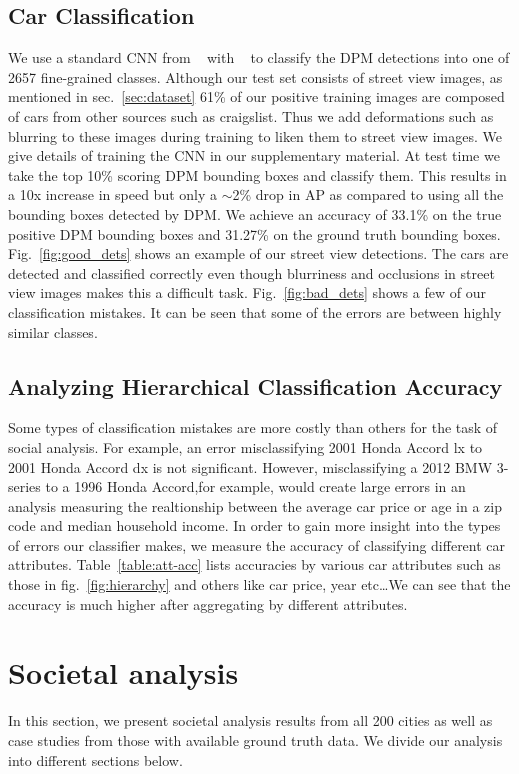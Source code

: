 \documentclass[10pt,twocolumn,letterpaper]{article}
\begin{document}
\subsection{Car Classification}
We use a standard CNN from ~\cite{alexnet} with ~\cite{caffe} to classify the DPM detections into one of 2657 fine-grained classes. Although our test set consists of street view images, as mentioned in sec.~\ref{sec:dataset} 61\% of our positive training images are composed of cars from other sources such as craigslist. Thus we add deformations such as blurring to these images during training to liken them to street view images. We give details of training the CNN in our supplementary material. At test time we take the top 10\% scoring DPM bounding boxes and classify them. This results in a 10x increase in speed but only a \(\sim\)2\% drop in AP as compared to using all the bounding boxes detected by DPM. We achieve an accuracy of 33.1\% on the true positive DPM bounding boxes and 31.27\% on the ground truth bounding boxes. Fig.~\ref{fig:good_dets} shows an example of our street view detections. The cars are detected and classified correctly even though blurriness and occlusions in street view images makes this a difficult task. Fig.~\ref{fig:bad_dets} shows a few of our classification mistakes. It can be seen that some of the errors are between highly similar classes.   

\subsection{Analyzing Hierarchical Classification Accuracy}
Some types of classification mistakes are more costly than others for the task of social analysis. For example, an error misclassifying 2001 Honda Accord lx to 2001 Honda Accord dx is not significant. However, misclassifying a 2012 BMW 3-series to a 1996 Honda Accord,for example, would create large errors in an analysis measuring the realtionship between the average car price or age in a zip code and median household income. In order to gain more insight into the types of errors our classifier makes, we measure the accuracy of classifying different car attributes. Table~\ref{table:att-acc} lists accuracies by various car attributes such as those in fig.~\ref{fig:hierarchy} and others like car price, year etc\ldots We can see that the accuracy is much higher after aggregating by different attributes.  

 \section{Societal analysis}
\label{sec:social}
In this section, we present societal analysis results from all 200 cities as well as case studies from those with available ground truth data. We divide our analysis into different sections below.
\end{document}
